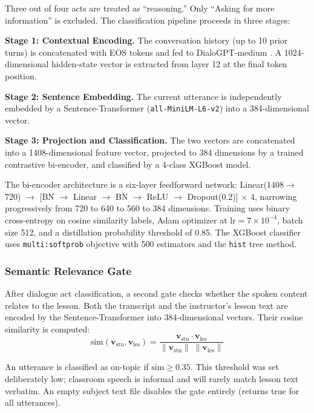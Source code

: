 \documentclass[conference]{IEEEtran}
\begin{document}
Three out of four acts are treated as ``reasoning.'' Only ``Asking for more information'' is excluded. The classification pipeline proceeds in three stages:

\textbf{Stage 1: Contextual Encoding.} The conversation history (up to 10 prior turns) is concatenated with EOS tokens and fed to DialoGPT-medium \cite{zhang2020}.
A 1024-dimensional hidden-state vector is extracted from layer 12 at the final token position.

\textbf{Stage 2: Sentence Embedding.} The current utterance is independently embedded by a Sentence-Transformer (\texttt{all-MiniLM-L6-v2}) \cite{reimers2019} into a 384-dimensional vector.

\textbf{Stage 3: Projection and Classification.} The two vectors are concatenated into a 1408-dimensional feature vector, projected to 384 dimensions by a trained contrastive bi-encoder, and classified by a 4-class XGBoost model.

The bi-encoder architecture is a six-layer feedforward network: Linear(1408$\rightarrow$720) $\rightarrow$ [BN $\rightarrow$ Linear $\rightarrow$ BN $\rightarrow$ ReLU $\rightarrow$ Dropout(0.2)] $\times$ 4, narrowing progressively from 720 to 640 to 560 to 384 dimensions. Training uses binary cross-entropy on cosine similarity labels, Adam optimizer at $\text{lr} = 7 \times 10^{-4}$, batch size 512, and a distillation probability threshold of 0.85. The XGBoost classifier uses \texttt{multi:softprob} objective with 500 estimators and the \texttt{hist} tree method.

\subsubsection{Semantic Relevance Gate}
After dialogue act classification, a second gate checks whether the spoken content relates to the lesson. Both the transcript and the instructor's lesson text are encoded by the Sentence-Transformer into 384-dimensional vectors. Their cosine similarity is computed:
\begin{equation}
\text{sim}(\mathbf{v}_{\text{stu}}, \mathbf{v}_{\text{les}}) = \frac{\mathbf{v}_{\text{stu}} \cdot \mathbf{v}_{\text{les}}}{\|\mathbf{v}_{\text{stu}}\| \; \|\mathbf{v}_{\text{les}}\|}
\label{eq:cosine}
\end{equation}

An utterance is classified as on-topic if $\text{sim} \geq 0.35$. This threshold was set deliberately low; classroom speech is informal and will rarely match lesson text verbatim. An empty subject text file disables the gate entirely (returns true for all utterances).
\end{document}
